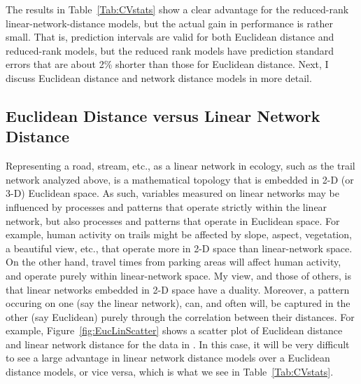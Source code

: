 \documentclass[11pt, titlepage]{article}\usepackage[]{graphicx}\usepackage[]{color}
\begin{document}
\begin{spacing}{1.9}
\begin{flushleft}
The results in Table~\ref{Tab:CVstats} show a clear advantage for the reduced-rank linear-network-distance models, but the actual gain in performance is rather small.  That is, prediction intervals are valid for both Euclidean distance and reduced-rank models, but the reduced rank models have prediction standard errors that are about 2\% shorter than those for Euclidean distance. Next, I discuss Euclidean distance and network distance models in more detail.

\subsection*{Euclidean Distance versus Linear Network Distance}




Representing a road, stream, etc., as a linear network in ecology, such as the trail network analyzed above, is a mathematical topology that is embedded in 2-D (or 3-D) Euclidean space.  As such, variables measured on linear networks may be influenced by processes and patterns that operate strictly within the linear network, but also processes and patterns that operate in Euclidean space. For example, human activity on trails might be affected by slope, aspect, vegetation, a beautiful view, etc., that operate more in 2-D space than linear-network space.  On the other hand, travel times from parking areas will affect human activity, and operate purely within linear-network space. My view, and those of others, \citep{Dale:Fort:from:2010,Pete:Ver:Isaa:stre:2013} is that linear networks embedded in 2-D space have a duality.  Moreover, a pattern occuring on one (say the linear network), can, and often will, be captured in the other (say Euclidean) purely through the correlation between their distances.  For example, Figure~\ref{fig:EucLinScatter} shows a scatter plot of Euclidean distance and linear network distance for the data in \citet{Ladl:Avga:Whea:Boyc:pred:2016}.  In this case, it will be very difficult to see a large advantage in linear network distance models over a Euclidean distance models, or vice versa, which is what we see in Table~\ref{Tab:CVstats}.


\end{flushleft}
\end{spacing}
\end{document}
